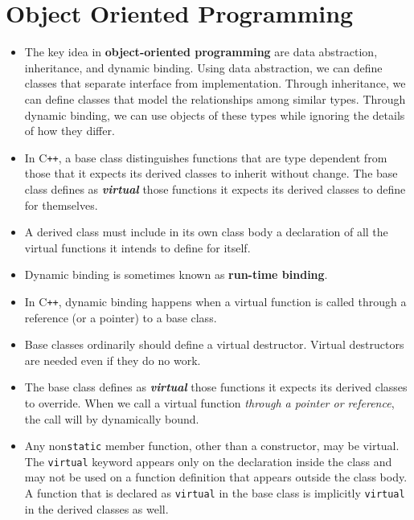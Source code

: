 \section{Object Oriented Programming}
\begin{itemize}

\item
The key idea in \textbf{object-oriented programming} are data abstraction, inheritance, and dynamic binding. Using data abstraction, we can define classes that separate interface from implementation. Through inheritance, we can define classes that model the relationships among similar types. Through dynamic binding, we can use objects of these types while ignoring the details of how they differ.

\item
In C\texttt{++}, a base class distinguishes functions that are type dependent from those that it expects its derived classes to inherit without change. The base class defines as \textbf{\textit{virtual}} those functions it expects its derived classes to define for themselves.

\item
A derived class must include in its own class body a declaration of all the virtual functions it intends to define for itself.

\item
Dynamic binding is sometimes known as \textbf{run-time binding}.

\item
In C\texttt{++}, dynamic binding happens when a virtual function is called through a reference (or a pointer) to a base class.

\item
Base classes ordinarily should define a virtual destructor. Virtual destructors are needed even if they do no work.

\item
The base class defines as \textbf{\textit{virtual}} those functions it expects its derived classes to override. When we call a virtual function \textit{through a pointer or reference}, the call will by dynamically bound.

\item
Any non\texttt{static} member function, other than a constructor, may be virtual. The \texttt{virtual} keyword appears only on the declaration inside the class and may not be used on a function definition that appears outside the class body. A function that is declared as \texttt{virtual} in the base class is implicitly \texttt{virtual} in the derived classes as well.


\end{itemize}
